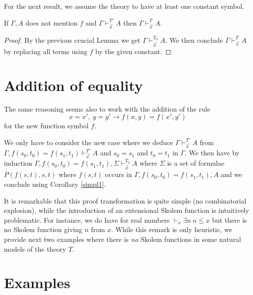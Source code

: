 \documentclass[10pt,a4paper]{article}
\begin{document}
 For the next result, we assume the theory to have at least one constant symbol.

\begin{theorem}
If $\Gamma,A$ does not mention $f$ and $\Gamma\vdash_{\vec{x}}^{T'} A$ then
$\Gamma\vdash_{\vec{x}}^T A$.
\end{theorem}

\begin{proof}
By the previous crucial Lemma we get $\Gamma\vdash_{\vec{x}}^{T_0} A$. We then conclude
$\Gamma\vdash_{\vec{x}}^T A$ by replacing all terms using $f$ by the given constant.
\end{proof}


\section{Addition of equality}

 The same reasoning seems also to work with the addition of the rule
$$x=x',~ y = y'\rightarrow f(x,y) = f(x',y')$$
for the new function symbol $f$.

 We only have to consider the new case where we deduce $\Gamma\vdash_{\vec{x}}^{T'} A$ from 
$\Gamma,f(s_0,t_0) = f(s_1,t_1)\vdash_{\vec{x}}^{T'} A$ and $s_0 = s_1$ and
$t_0 = t_1$ in $\Gamma$. We then have by induction
$\Gamma,f(s_0,t_0) = f(s_1,t_1),\Sigma \vdash_{\vec{x}}^{T_0} A$
where  $\Sigma$ is a set of formulae $P(f(s,t),s,t)$ where $f(s,t)$ occurs
in $\Gamma,f(s_0,t_0) = f(s_1,t_1),A$ and we conclude using Corollary \ref{simpl1}.

\medskip

 It is remarkable that this proof transformation is quite simple (no combinatorial explosion), while
the introduction of an extensional Skolem function is intuitively problematic. For instance,
we do have for real numbers $\vdash_x \exists n~n\leqslant x$ but there is no Skolem function
giving $n$ from $x$. While this remark is only heuristic, we provide next two examples where there
is {\em no} Skolem functions in some natural models of the theory $T$.

\section{Examples}
\end{document}
